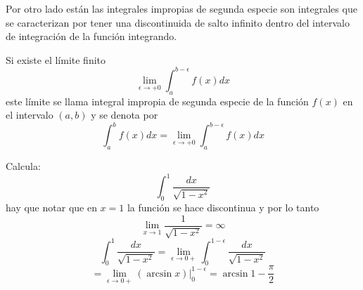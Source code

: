 \documentclass[10pt,twoside]{SelfArx} %
\begin{document}
Por otro lado están las integrales impropias de segunda especie son integrales que se caracterizan por tener una discontinuida de salto infinito dentro del intervalo de integración de la función integrando.
\begin{thm}
	Si existe el límite finito
	\[ 
	\lim\limits_{\epsilon\rightarrow+0}\int_{a}^{b-\epsilon}f(x)dx
	 \]
	 este límite se llama integral impropia de segunda especie de la función $ f(x) $ en el intervalo $ (a,b) $ y se denota por
	 \begin{equation}
	\displaystyle\int_{a}^{b}f(x)dx=\lim\limits_{\epsilon\rightarrow+0}\int_{a}^{b-\epsilon}f(x)dx
	 \end{equation}
\end{thm}
\begin{ejemplo}
	Calcula:
	\[ \int_{0}^{1}\dfrac{dx}{\sqrt{1-x^{2}}} \]
	hay que notar que en $ x=1 $ la función se hace discontinua y por lo tanto 
	\[  \lim\limits_{x\rightarrow1}\dfrac{1}{\sqrt{1-x^{2}}}=\infty \]
	\begin{equation}
	\int_{0}^{1}\dfrac{dx}{\sqrt{1-x^{2}}}= \lim\limits_{\epsilon\rightarrow0+}\int_{0}^{1-\epsilon}\dfrac{dx}{\sqrt{1-x^{2}}}
	\end{equation}
	\begin{equation}
	=\lim\limits_{\epsilon\rightarrow0+}(\arcsin x)\biggl|_{0}^{1-\epsilon}=\arcsin1-\dfrac{\pi}{2}
	\end{equation}
\end{ejemplo}
\end{document}
